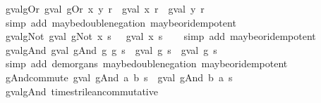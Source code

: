\begin{isabellebody}
\isanewline
{}\isamarkupfalse%
\ gval{\isacharunderscore}gOr{\isacharcolon}\ {\isachardoublequoteopen}gval\ {\isacharparenleft}gOr\ x\ y{\isacharparenright}\ r\ {\isacharequal}\ {\isacharparenleft}gval\ x\ r{\isacharparenright}\ {\isasymor}\isactrlsub {\isacharquery}\ {\isacharparenleft}gval\ y\ r{\isacharparenright}{\isachardoublequoteclose}\isanewline
%
\isadelimproof
\ \ %
\endisadelimproof
%
\isatagproof
{}\isamarkupfalse%
\ {\isacharparenleft}simp\ add{\isacharcolon}\ maybe{\isacharunderscore}double{\isacharunderscore}negation\ maybe{\isacharunderscore}or{\isacharunderscore}idempotent{\isacharparenright}%
\endisatagproof
{\isafoldproof}%
%
\isadelimproof
\isanewline
%
\endisadelimproof
\isanewline
{}\isamarkupfalse%
\ gval{\isacharunderscore}gNot{\isacharcolon}\ {\isachardoublequoteopen}gval\ {\isacharparenleft}gNot\ x{\isacharparenright}\ s\ {\isacharequal}\ {\isasymnot}\isactrlsub {\isacharquery}\ {\isacharparenleft}gval\ x\ s{\isacharparenright}{\isachardoublequoteclose}\isanewline
%
\isadelimproof
\ \ %
\endisadelimproof
%
\isatagproof
{}\isamarkupfalse%
\ {\isacharparenleft}simp\ add{\isacharcolon}\ maybe{\isacharunderscore}or{\isacharunderscore}idempotent{\isacharparenright}%
\endisatagproof
{\isafoldproof}%
%
\isadelimproof
\isanewline
%
\endisadelimproof
\isanewline
{}\isamarkupfalse%
\ gval{\isacharunderscore}gAnd{\isacharcolon}\ {\isachardoublequoteopen}gval\ {\isacharparenleft}gAnd\ g{}\ g{}{\isacharparenright}\ s\ {\isacharequal}\ {\isacharparenleft}gval\ g{}\ s{\isacharparenright}\ {\isasymand}\isactrlsub {\isacharquery}\ {\isacharparenleft}gval\ g{}\ s{\isacharparenright}{\isachardoublequoteclose}\isanewline
%
\isadelimproof
\ \ %
\endisadelimproof
%
\isatagproof
{}\isamarkupfalse%
\ {\isacharparenleft}simp\ add{\isacharcolon}\ de{\isacharunderscore}morgans{\isacharunderscore}{}\ maybe{\isacharunderscore}double{\isacharunderscore}negation\ maybe{\isacharunderscore}or{\isacharunderscore}idempotent{\isacharparenright}%
\endisatagproof
{\isafoldproof}%
%
\isadelimproof
\isanewline
%
\endisadelimproof
\isanewline
{}\isamarkupfalse%
\ gAnd{\isacharunderscore}commute{\isacharcolon}\ {\isachardoublequoteopen}gval\ {\isacharparenleft}gAnd\ a\ b{\isacharparenright}\ s\ {\isacharequal}\ gval\ {\isacharparenleft}gAnd\ b\ a{\isacharparenright}\ s{\isachardoublequoteclose}\isanewline
%
\isadelimproof
\ \ %
\endisadelimproof
%
\isatagproof
{}\isamarkupfalse%
\ gval{\isacharunderscore}gAnd\ times{\isacharunderscore}trilean{\isacharunderscore}commutative\ \isamarkupfalse%

\end{isabellebody}
